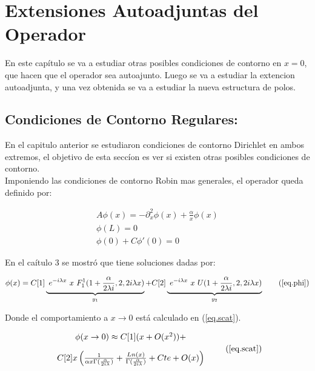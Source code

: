 \chapter{Extensiones Autoadjuntas del Operador}

	En este capítulo se va a estudiar otras posibles condiciones de contorno en $x=0$, que hacen que el operador sea autoajunto. Luego se va a estudiar la extencion autoadjunta, y una vez obtenida se va a estudiar la nueva estructura de polos. 


\section{Condiciones de Contorno Regulares:}

En el capitulo anterior se estudiaron condiciones de contorno Dirichlet en ambos extremos, el objetivo de esta seccíon es ver si existen otras posibles condiciones de contorno.\\

Imponiendo las condiciones de contorno Robin mas generales, el operador queda definido por:

\begin{equation}
\begin{array}{c}
    A \phi (x) = - \partial ^2 _x  \phi(x) + \frac{\alpha}{x} \phi(x) \\
    \phi(L) = 0 \\
    \phi (0) + C \phi'(0) = 0 
\end{array}
\label{operador}
\end{equation}



En el caítulo 3 se mostró que tiene soluciones dadas por:

\begin{equation}
    \phi (x) = 
    C[1]
    \underbrace{
     \ e ^{-i \lambda x} \ x \ F _{1} ^{1} (1+\frac{ \alpha}{2 \lambda i },2,2 i \lambda x) } _ {y_1}
    + C[2] \underbrace{ \ e^{-i \lambda x } \ x \ U (1+\frac{ \alpha}{2 \lambda i },2,2 i \lambda x) } _{y_2} 
\tag{\ref{eq.phi}}
\end{equation}

Donde el comportamiento a $x \rightarrow 0$ está calculado en (\ref{eq.scat}).

\begin{equation}
\begin{array}{c}
\phi (x \rightarrow 0) \approx
C[1] ( x + O(x ^2)) + \\[10pt]
C[2] x 
\left( 
\frac{1}{  \alpha x  \Gamma ( \frac{ \alpha}{2 i \lambda}  )   }  +
\frac{Ln(x) }{\Gamma ( \frac{ \alpha}{2 i \lambda} ) } + Cte + O(x)
\right)
\end{array}
\tag{\ref{eq.scat}}
\end{equation}

